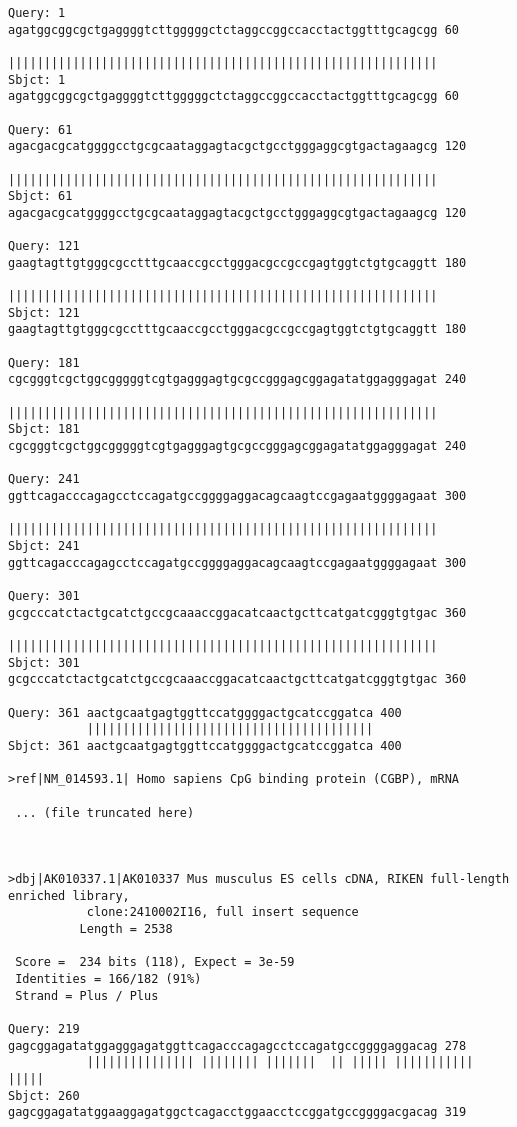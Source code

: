 \begin{lstlisting}
Query: 1   agatggcggcgctgaggggtcttgggggctctaggccggccacctactggtttgcagcgg 60
           ||||||||||||||||||||||||||||||||||||||||||||||||||||||||||||
Sbjct: 1   agatggcggcgctgaggggtcttgggggctctaggccggccacctactggtttgcagcgg 60

Query: 61  agacgacgcatggggcctgcgcaataggagtacgctgcctgggaggcgtgactagaagcg 120
           ||||||||||||||||||||||||||||||||||||||||||||||||||||||||||||
Sbjct: 61  agacgacgcatggggcctgcgcaataggagtacgctgcctgggaggcgtgactagaagcg 120

Query: 121 gaagtagttgtgggcgcctttgcaaccgcctgggacgccgccgagtggtctgtgcaggtt 180
           ||||||||||||||||||||||||||||||||||||||||||||||||||||||||||||
Sbjct: 121 gaagtagttgtgggcgcctttgcaaccgcctgggacgccgccgagtggtctgtgcaggtt 180

Query: 181 cgcgggtcgctggcgggggtcgtgagggagtgcgccgggagcggagatatggagggagat 240
           ||||||||||||||||||||||||||||||||||||||||||||||||||||||||||||
Sbjct: 181 cgcgggtcgctggcgggggtcgtgagggagtgcgccgggagcggagatatggagggagat 240

Query: 241 ggttcagacccagagcctccagatgccggggaggacagcaagtccgagaatggggagaat 300
           ||||||||||||||||||||||||||||||||||||||||||||||||||||||||||||
Sbjct: 241 ggttcagacccagagcctccagatgccggggaggacagcaagtccgagaatggggagaat 300

Query: 301 gcgcccatctactgcatctgccgcaaaccggacatcaactgcttcatgatcgggtgtgac 360
           ||||||||||||||||||||||||||||||||||||||||||||||||||||||||||||
Sbjct: 301 gcgcccatctactgcatctgccgcaaaccggacatcaactgcttcatgatcgggtgtgac 360

Query: 361 aactgcaatgagtggttccatggggactgcatccggatca 400
           ||||||||||||||||||||||||||||||||||||||||
Sbjct: 361 aactgcaatgagtggttccatggggactgcatccggatca 400

>ref|NM_014593.1| Homo sapiens CpG binding protein (CGBP), mRNA

 ... (file truncated here)



>dbj|AK010337.1|AK010337 Mus musculus ES cells cDNA, RIKEN full-length
enriched library,
           clone:2410002I16, full insert sequence
          Length = 2538

 Score =  234 bits (118), Expect = 3e-59
 Identities = 166/182 (91%)
 Strand = Plus / Plus

Query: 219 gagcggagatatggagggagatggttcagacccagagcctccagatgccggggaggacag 278
           ||||||||||||||| |||||||| |||||||  || ||||| ||||||||||| |||||
Sbjct: 260 gagcggagatatggaaggagatggctcagacctggaacctccggatgccggggacgacag 319


\end{lstlisting}
